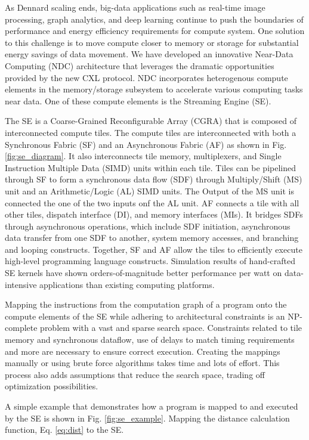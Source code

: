 As Dennard scaling ends, big-data applications such as real-time image processing, graph analytics, and deep learning continue to push the boundaries of performance and energy efficiency requirements for compute system. 
One solution to this challenge is to move compute closer to memory or storage for substantial energy savings of data movement. 
We have developed an innovative Near-Data Computing (NDC) architecture that leverages the dramatic opportunities provided by the new CXL protocol. 
NDC incorporates heterogenous compute elements in the memory/storage subsystem to accelerate various computing tasks near data. 
One of these compute elements is the Streaming Engine (SE).

The SE is a Coarse-Grained Reconfigurable Array (CGRA) that is composed of interconnected compute tiles.  
The compute tiles are interconnected with both a Synchronous Fabric (SF) and an Asynchronous Fabric (AF) as shown in Fig. \ref{fig:se_diagram}.
It also interconnects tile memory, multiplexers, and Single Instruction Multiple Data (SIMD) units within each tile. 
Tiles can be pipelined through SF to form a synchronous data flow (SDF) through Multiply/Shift (MS) unit and an Arithmetic/Logic (AL) SIMD units. 
The Output of the MS unit is connected the one of the two inputs onf the AL unit.
AF connects a tile with all other tiles, dispatch interface (DI), and memory interfaces (MIs).
It bridges SDFs through asynchronous operations, which include SDF initiation, asynchronous data transfer from one SDF to another, system memory accesses, and branching and looping constructs. 
Together, SF and AF allow the tiles to efficiently execute high-level programming language constructs. 
Simulation results of hand-crafted SE kernels have shown orders-of-magnitude better performance per watt on data-intensive applications than existing computing platforms.


Mapping the instructions from the computation graph of a program onto the compute elements of the SE while adhering to architectural constraints is an NP-complete problem with a vast and sparse search space. 
Constraints related to tile memory and synchronous dataflow, use of delays to match timing requirements and more are necessary to ensure correct execution. 
Creating the mappings manually or using brute force algorithms takes time and lots of effort. 
This process also adds assumptions that reduce the search space, trading off optimization possibilities.  

A simple example that demonstrates how a program is mapped to and executed by the SE is shown in Fig. \ref{fig:se_example}.
Mapping the distance calculation function, Eq. \ref{eq:dist} to the SE.

